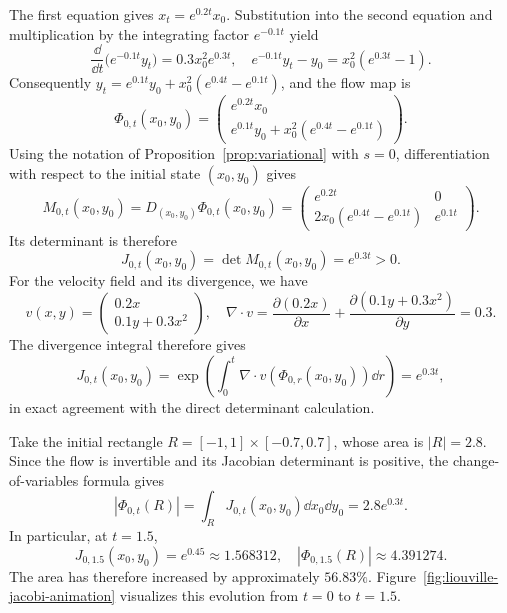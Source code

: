 \documentclass[12pt,a4paper,oneside]{book}
\begin{document}
\begin{example}
The first equation gives $x_t=e^{0.2t}x_0$. Substitution into the second equation and multiplication by the integrating
factor $e^{-0.1t}$ yield
\begin{equation*}
    \frac{\dd}{\dd t}\bigl(e^{-0.1t}y_t\bigr)=0.3x_0^2e^{0.3t},
    \quad e^{-0.1t}y_t-y_0=x_0^2(e^{0.3t}-1).
\end{equation*}
Consequently $y_t=e^{0.1t}y_0+x_0^2(e^{0.4t}-e^{0.1t})$, and the flow map is
\begin{equation*}
    \Phi_{0,t}(x_0,y_0)=
        \begin{pmatrix}
            e^{0.2t}x_0\\
            e^{0.1t}y_0+x_0^2(e^{0.4t}-e^{0.1t})
        \end{pmatrix}.
\end{equation*}
Using the notation of Proposition~\ref{prop:variational} with $s=0$, differentiation with respect to the initial state
$(x_0,y_0)$ gives
\begin{equation*}
    M_{0,t}(x_0,y_0)=D_{(x_0,y_0)}\Phi_{0,t}(x_0,y_0)=
        \begin{pmatrix}
            e^{0.2t}&0\\
            2x_0(e^{0.4t}-e^{0.1t})&e^{0.1t}
        \end{pmatrix}.
\end{equation*}
Its determinant is therefore
\begin{equation*}
    J_{0,t}(x_0,y_0)=\det M_{0,t}(x_0,y_0)=e^{0.3t}>0.
\end{equation*}
For the velocity field and its divergence, we have
\begin{equation*}
    v(x,y)=\begin{pmatrix}0.2x\\0.1y+0.3x^2\end{pmatrix}, \quad
    \nabla\cdot v= \frac{\partial(0.2x)}{\partial x} + \frac{\partial(0.1y+0.3x^2)}{\partial y}=0.3.
\end{equation*}
The divergence integral therefore gives
\begin{equation*}
    J_{0,t}(x_0,y_0) = \exp\left(\int_0^t\nabla\cdot v(\Phi_{0,r}(x_0,y_0))\dd r\right) = e^{0.3t},
\end{equation*}
in exact agreement with the direct determinant calculation.

Take the initial rectangle $R=[-1,1]\times[-0.7,0.7]$, whose area is $|R|=2.8$. Since the flow is invertible and its Jacobian
determinant is positive, the change-of-variables formula gives
\begin{equation*}
    |\Phi_{0,t}(R)| = \int_R J_{0,t}(x_0,y_0)\dd x_0\dd y_0 = 2.8e^{0.3t}.
\end{equation*}
In particular, at $t=1.5$,
\begin{equation*}
    J_{0,1.5}(x_0,y_0)=e^{0.45}\approx1.568312,\quad |\Phi_{0,1.5}(R)|\approx4.391274.
\end{equation*}
The area has therefore increased by approximately $56.83\%$. Figure~\ref{fig:liouville-jacobi-animation} visualizes this
evolution from $t=0$ to $t=1.5$.


\end{example}
\end{document}
